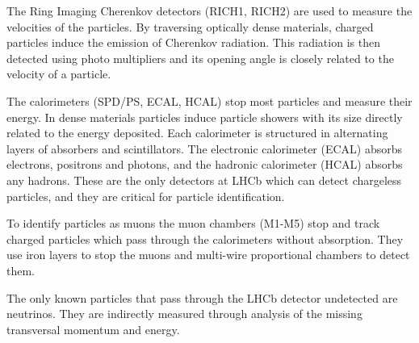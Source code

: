 The Ring Imaging Cherenkov detectors (RICH1, RICH2) are used to measure the velocities of the particles.
By traversing optically dense materials, charged particles induce the emission of Cherenkov radiation.
This radiation is then detected using photo multipliers and its opening angle is closely related to the velocity of a particle.

The calorimeters (SPD/PS, ECAL, HCAL) stop most particles and measure their energy.
In dense materials particles induce particle showers with its size directly related to the energy deposited.
Each calorimeter is structured in alternating layers of absorbers and scintillators.
The electronic calorimeter (ECAL) absorbs electrons, positrons and photons, and the hadronic calorimeter (HCAL) absorbs any hadrons.
These are the only detectors at LHCb which can detect chargeless particles, and they are critical for particle identification.

To identify particles as muons the muon chambers (M1-M5) stop and track charged particles which pass through the calorimeters without absorption.
They use iron layers to stop the muons and multi-wire proportional chambers to detect them.

The only known particles that pass through the LHCb detector undetected are neutrinos.
They are indirectly measured through analysis of the missing transversal momentum and energy. 


